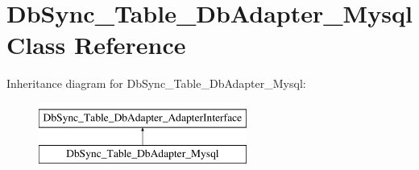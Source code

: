 \hypertarget{classDbSync__Table__DbAdapter__Mysql}{
\section{DbSync\_\-Table\_\-DbAdapter\_\-Mysql Class Reference}
\label{classDbSync__Table__DbAdapter__Mysql}
}
Inheritance diagram for DbSync\_\-Table\_\-DbAdapter\_\-Mysql:\begin{figure}[H]
\begin{center}
\leavevmode
\includegraphics[height=2.000000cm]{classDbSync__Table__DbAdapter__Mysql}
\end{center}
\end{figure}
